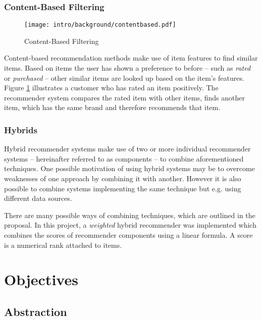 \subsubsection{Content-Based Filtering}

\begin{figure}[ht]
    \texttt{[image: intro/background/contentbased.pdf]}
    \caption{Content-Based Filtering}
    \label{fig:contentbased}
\end{figure}

Content-based recommendation methods make use of item features to find similar items. Based on items the user has shown a preference to before -- such as \emph{rated} or \emph{purchased} -- other similar items are looked up based on the item's features. Figure \ref{fig:contentbased} illustrates a customer who has rated an item positively. The recommender system compares the rated item with other items, finds another item, which has the same brand and therefore recommends that item.

\subsubsection{Hybrids}
\label{intro-bg-tech-hybrid}

Hybrid recommender systems make use of two or more individual recommender systems -- hereinafter referred to as components -- to combine aforementioned techniques. One possible motivation of using hybrid systems may be to overcome weaknesses of one approach by combining it with another. However it is also possible to combine systems implementing the same technique but e.g. using different data sources.

There are many possible ways of combining techniques, which are outlined in the proposal. In this project, a \emph{weighted} hybrid recommender was implemented which combines the scores of recommender components using a linear formula. A score is a numerical rank attached to items.

\section{Objectives}
\label{intro-objectives}

\subsection{Abstraction}
\label{intro-objectives-abstraction}

